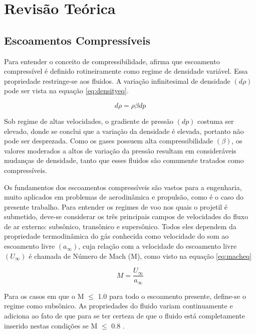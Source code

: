 \chapter{Revisão Teórica}
\graphicspath{{chapter-02/img-cap02/}}

\noindent
\section{Escoamentos Compressíveis}

Para entender o conceito de compressibilidade, \citeauthor{anderson_modern_2002} afirma que escoamento compressível é definido rotineiramente como regime de densidade variável. Essa propriedade restringe-se aos fluidos. A variação infinitesimal de densidade \(\left(d\rho\right)\) pode ser vista na equação \ref{eq:densityeq}. 

\begin{equation} \label{eq:densityeq}
    d\rho = \rho\beta dp
\end{equation}

Sob regime de altas velocidades, o gradiente de pressão \(\left(dp\right)\) costuma ser elevado, donde se conclui que a variação da densidade é elevada, portanto não pode ser desprezada. Como os gases possuem alta compressibilidade \(\left(\beta\right)\), os valores moderados a altos de variação da pressão resultam em consideráveis mudanças de densidade, tanto que esses fluidos são comumente tratados como compressíveis.

Os fundamentos dos escoamentos compressíveis são vastos para a engenharia, muito aplicados em problemas de aerodinâmica e propulsão, como é o caso do presente trabalho. Para entender os regimes de voo nos quais o projetil é submetido, deve-se considerar os três principais campos de velocidades do fluxo de ar externo: subsônico, transônico e supersônico. Todos eles dependem da propriedade termodinâmica do gás conhecida como velocidade do som ao escoamento livre \(\left(a_{\infty}\right)\), cuja relação com a velocidade do escoamento livre \(\left(U_{\infty}\right)\) é chamada de Número de Mach (M), como visto na equação \ref{eq:macheq}

\begin{equation} \label{eq:macheq}
    M = \frac{U_\infty}{a_\infty}
\end{equation}

Para os casos em que o M \(\leq\) \num{1,0} para todo o escoamento presente, define-se o regime como subsônico. As propriedades do fluido variam continuamente e adiciona ao fato de que para se ter certeza de que o fluido está completamente inserido nestas condições se M \(\leq\) \num{0,8} \cite{anderson_modern_2002}. 

